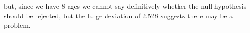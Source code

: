 \documentclass[a4paper,12pt]{article}
\begin{document}
but, since we have 8 ages we cannot say definitively whether the null hypothesis should be rejected, but the large deviation of 2.528 suggests there may be a problem.


\end{document}
